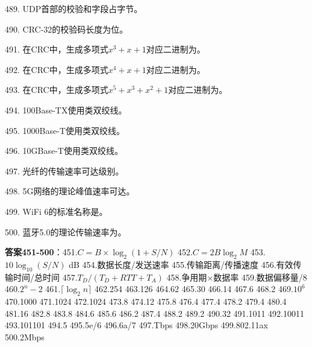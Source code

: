 489. UDP首部的校验和字段占\underline{\hspace{2cm}}字节。

490. CRC-32的校验码长度为\underline{\hspace{2cm}}位。

491. 在CRC中，生成多项式$x^3+x+1$对应二进制为\underline{\hspace{2cm}}。

492. 在CRC中，生成多项式$x^4+x+1$对应二进制为\underline{\hspace{2cm}}。

493. 在CRC中，生成多项式$x^5+x^3+x^2+1$对应二进制为\underline{\hspace{2cm}}。

494. 100Base-TX使用\underline{\hspace{2cm}}类双绞线。

495. 1000Base-T使用\underline{\hspace{2cm}}类双绞线。

496. 10GBase-T使用\underline{\hspace{2cm}}类双绞线。

497. 光纤的传输速率可达\underline{\hspace{2cm}}级别。

498. 5G网络的理论峰值速率可达\underline{\hspace{2cm}}。

499. WiFi 6的标准名称是\underline{\hspace{2cm}}。

500. 蓝牙5.0的理论传输速率为\underline{\hspace{2cm}}。

\textbf{答案451-500}：451.$C=B\times\log_2(1+S/N)$ 452.$C=2B\log_2M$ 453.$10\log_{10}(S/N)$ dB 454.数据长度/发送速率 455.传输距离/传播速度 456.有效传输时间/总时间 457.$T_D/(T_D+RTT+T_A)$ 458.争用期$\times$数据率 459.数据偏移量/8 460.$2^n-2$ 461.$\lceil\log_2 n\rceil$ 462.254 463.126 464.62 465.30 466.14 467.6 468.2 469.$10^6$ 470.1000 471.1024 472.1024 473.8 474.12 475.8 476.4 477.4 478.2 479.4 480.4 481.16 482.8 483.8 484.6 485.6 486.2 487.4 488.2 489.2 490.32 491.1011 492.10011 493.101101 494.5 495.5e/6 496.6a/7 497.Tbps 498.20Gbps 499.802.11ax 500.2Mbps
